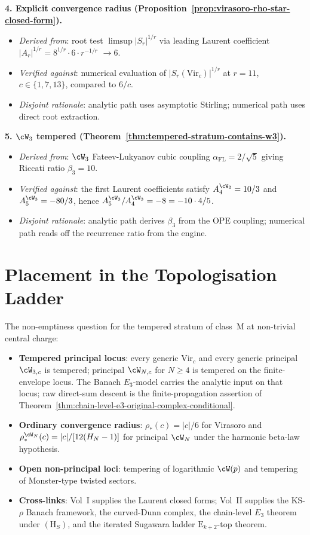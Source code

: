 \textbf{4. Explicit convergence radius
(Proposition~\ref{prop:virasoro-rho-star-closed-form}).}
\begin{itemize}[nosep]
\item \emph{Derived from}: root test $\limsup |S_r|^{1/r}$ via leading
 Laurent coefficient $|A_r|^{1/r} = 8^{1/r} \cdot 6 \cdot r^{-1/r}$
 $\to 6$.
\item \emph{Verified against}: numerical evaluation of
 $|S_r(\mathrm{Vir}_c)|^{1/r}$ at $r = 11$, $c \in \{1, 7, 13\}$,
 compared to $6/c$.
\item \emph{Disjoint rationale}: analytic path uses asymptotic
 Stirling; numerical path uses direct root extraction.
\end{itemize}

\textbf{5. $\cW_3$ tempered
(Theorem~\ref{thm:tempered-stratum-contains-w3}).}
\begin{itemize}[nosep]
\item \emph{Derived from}: $\cW_3$ Fateev-Lukyanov cubic coupling
 $\alpha_{\mathrm{FL}} = 2/\sqrt{5}$ giving Riccati ratio $\beta_3 =
 10$.
\item \emph{Verified against}: the first Laurent coefficients satisfy
 $A_4^{\cW_3}=10/3$ and $A_5^{\cW_3}=-80/3$, hence
 $A_5^{\cW_3}/A_4^{\cW_3}=-8=-10\cdot 4/5$.
\item \emph{Disjoint rationale}: analytic path derives $\beta_3$ from
 the OPE coupling; numerical path reads off the recurrence ratio from
 the engine.
\end{itemize}

\section{Placement in the Topologisation Ladder}
\label{sec:tempered-stratum-location}

The non-emptiness question for the tempered stratum of class~M at
non-trivial central charge:

\begin{itemize}[nosep]
\item \textbf{Tempered principal locus}: every generic
 $\mathrm{Vir}_c$ and every generic principal $\cW_{3,c}$ is
 tempered; principal $\cW_{N,c}$ for $N\ge4$ is tempered on the
 finite-envelope locus. The Banach $E_3$-model carries the analytic
 input on that locus; raw direct-sum descent is the finite-propagation
 assertion of
 Theorem~\ref{thm:chain-level-e3-original-complex-conditional}.
\item \textbf{Ordinary convergence radius}:
 $\rho_*(c)=|c|/6$ for Virasoro and
 $\rho_*^{\cW_N}(c)=|c|/[12(H_N-1)]$ for principal $\cW_N$ under the
 harmonic beta-law hypothesis.
\item \textbf{Open non-principal loci}: tempering of logarithmic
 $\cW(p)$ and tempering of Monster-type twisted sectors.
\item \textbf{Cross-links}: Vol~I supplies the Laurent closed forms;
Vol~II supplies the KS-$\rho$ Banach framework, the curved-Dunn
complex, the chain-level $E_3$ theorem under $(\mathrm{H}_S)$, and
the iterated Sugawara ladder $\mathrm{E}_{k+2}$-top theorem.
\end{itemize}

